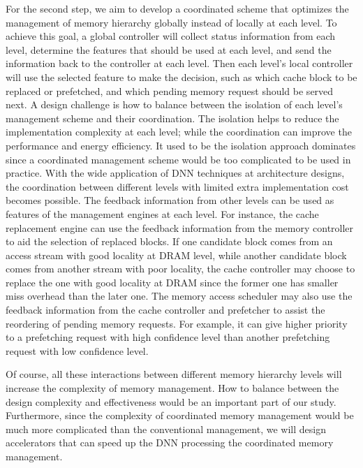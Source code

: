 For the second step, we aim to develop a coordinated scheme that optimizes
the management of memory hierarchy globally instead of locally at each
level.  To achieve this goal, a global controller will collect status
information from each level, determine the features that should be used
at each level, and send the information back to the controller at each
level.  Then each level's local controller will use the selected
feature to make the decision, such as which cache block to be replaced
or prefetched, and which pending memory request should be served next.
A design challenge is how to balance between the isolation of each level's
management scheme and their coordination.  The isolation helps to reduce
the implementation complexity at each level; while the coordination can
improve the performance and energy efficiency.  It used to be the isolation
approach dominates since a coordinated management scheme would be too
complicated to be used in practice.  With the wide application of DNN
techniques at architecture designs, the coordination between different
levels with limited extra implementation cost becomes possible.  The
feedback information from other levels can be used as features of the
management engines at each level.  For instance, the cache replacement
engine can use the feedback information from the memory controller to
aid the selection of replaced blocks.  If one candidate block comes
from an access stream with good locality at DRAM level, while another
candidate block comes from another stream with poor locality, the
cache controller may choose to replace the one with good locality at
DRAM since the former one has smaller miss overhead than the later one.
The memory access scheduler may also use the feedback information from
the cache controller and prefetcher to assist the reordering of
pending memory requests.  For example, it can give higher priority
to a prefetching request with high confidence level than another
prefetching request with low confidence level.

Of course, all these interactions between different memory hierarchy
levels will increase the complexity of memory management. How to balance
between the design complexity and effectiveness would be an important
part of our study.  Furthermore, since the complexity of coordinated
memory management would be much more complicated than the conventional
management, we will design accelerators that can speed up the DNN
processing the coordinated memory management.
